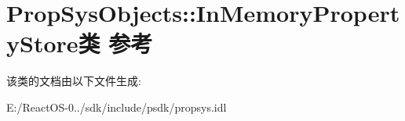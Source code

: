 \hypertarget{class_prop_sys_objects_1_1_in_memory_property_store}{}\section{Prop\+Sys\+Objects\+:\+:In\+Memory\+Property\+Store类 参考}
\label{class_prop_sys_objects_1_1_in_memory_property_store}


该类的文档由以下文件生成\+:\begin{DoxyCompactItemize}
\item 
E\+:/\+React\+O\+S-\/0../sdk/include/psdk/propsys.\+idl\end{DoxyCompactItemize}
